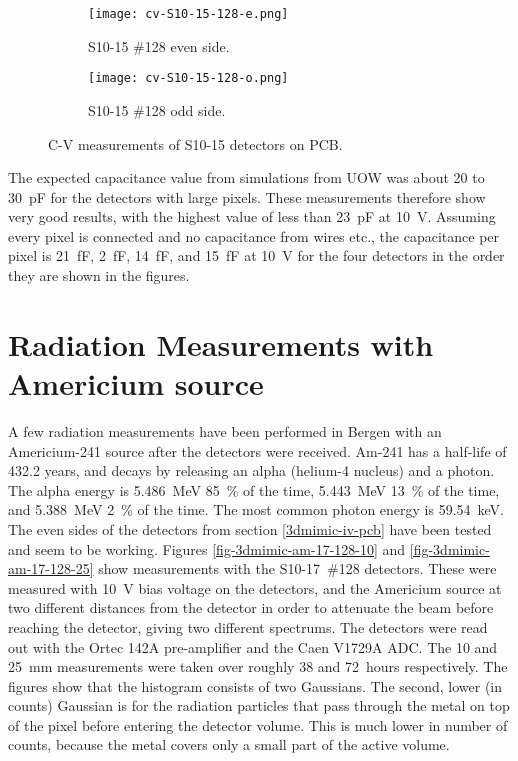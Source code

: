 \documentclass[../main/thesis.tex]{subfiles}
\begin{document}
\begin{figure}[h!]
	\centering
	\begin{subfigure}{.5\textwidth}
		\centering
		\texttt{[image: cv-S10-15-128-e.png]}
		\caption{S10-15 \#128 even side.}
		\label{fig-cv-S10-15-128-e}
	\end{subfigure}%
	\begin{subfigure}{.5\textwidth}
		\centering
		\texttt{[image: cv-S10-15-128-o.png]}
		\caption{S10-15 \#128 odd side.}
		\label{fig-cv-S10-15-128-o}
	\end{subfigure}
	\caption{C-V measurements of S10-15 detectors on PCB.}
	\label{fig-3d-cv-S10-15}
\end{figure}

The expected capacitance value from simulations from \gls{UOW} was about 20 to 30~pF for the detectors with large pixels. These measurements therefore show very good results, with the highest value of less than 23~pF at 10~V. Assuming every pixel is connected and no capacitance from wires etc., the capacitance per pixel is 21~fF, 2~fF, 14~fF, and 15~fF at 10~V for the four detectors in the order they are shown in the figures. 

\newpage
\section{Radiation Measurements with Americium source}

A few radiation measurements have been performed in Bergen with an Americium-241 source after the detectors were received. Am-241 has a half-life of 432.2 years, and decays by releasing an alpha (helium-4 nucleus) and a photon. The alpha energy is 5.486~MeV 85~\% of the time, 5.443~MeV 13~\% of the time, and 5.388~MeV 2~\% of the time. The most common photon  energy is 59.54~keV. \citep{Lund} The even sides of the detectors from section \ref{3dmimic-iv-pcb} have been tested and seem to be working. Figures \ref{fig-3dmimic-am-17-128-10} and \ref{fig-3dmimic-am-17-128-25} show measurements with the S10-17~\#128 detectors. These were measured with 10~V bias voltage on the detectors, and the Americium source at two different distances from the detector in order to attenuate the beam before reaching the detector, giving two different spectrums. The detectors were read out with the Ortec 142A pre-amplifier and the Caen V1729A ADC. The 10 and 25~mm measurements were taken over roughly 38 and 72~hours respectively. The figures show that the histogram consists of two Gaussians. The second, lower (in counts) Gaussian is for the radiation particles that pass through the metal on top of the pixel before entering the detector volume. This is much lower in number of counts, because the metal covers only a small part of the active volume. 
\end{document}
